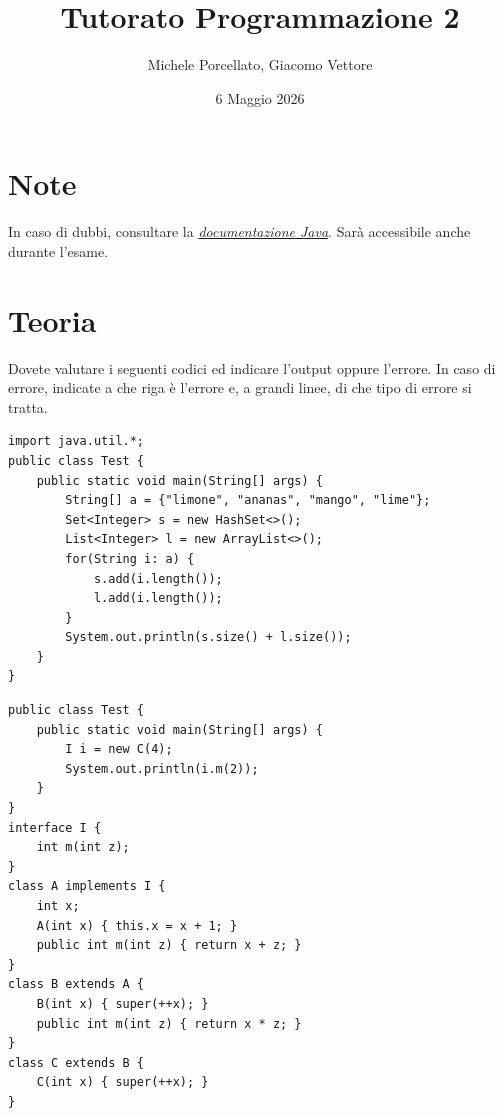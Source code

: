 \documentclass{article}
\title{Tutorato Programmazione 2}
\author{Michele Porcellato, Giacomo Vettore}
\date{6 Maggio 2026}
\begin{document}
\maketitle

\section{Note}
In caso di dubbi, consultare la \href{https://docs.oracle.com/en/java/javase/25/docs/api/index.html}{\textit{documentazione Java}}. Sarà accessibile anche durante l'esame.

\section{Teoria}

Dovete valutare i seguenti codici ed indicare l’output oppure l’errore. In caso di errore, indicate a che
riga è l’errore e, a grandi linee, di che tipo di errore si tratta.

\begin{verbatim}
import java.util.*;
public class Test {
    public static void main(String[] args) {
        String[] a = {"limone", "ananas", "mango", "lime"};
        Set<Integer> s = new HashSet<>();
        List<Integer> l = new ArrayList<>();
        for(String i: a) {
            s.add(i.length());
            l.add(i.length());
        }
        System.out.println(s.size() + l.size());
    }
}
\end{verbatim}

\begin{tcolorbox}[
    width=\textwidth,
    height=5cm,
    valign=center, %
    halign=center, %
    sharp corners  %
]
\end{tcolorbox}

\begin{verbatim}
public class Test {
    public static void main(String[] args) {
        I i = new C(4);
        System.out.println(i.m(2));
    }
}
interface I {
    int m(int z);
}
class A implements I {
    int x;
    A(int x) { this.x = x + 1; }
    public int m(int z) { return x + z; }
}
class B extends A { 
    B(int x) { super(++x); }
    public int m(int z) { return x * z; }
}
class C extends B {
    C(int x) { super(++x); }
}
\end{verbatim}

\begin{tcolorbox}[
    width=\textwidth,
    height=5cm,
    valign=center, %
    halign=center, %
    sharp corners  %
]
\end{tcolorbox}
\end{document}
